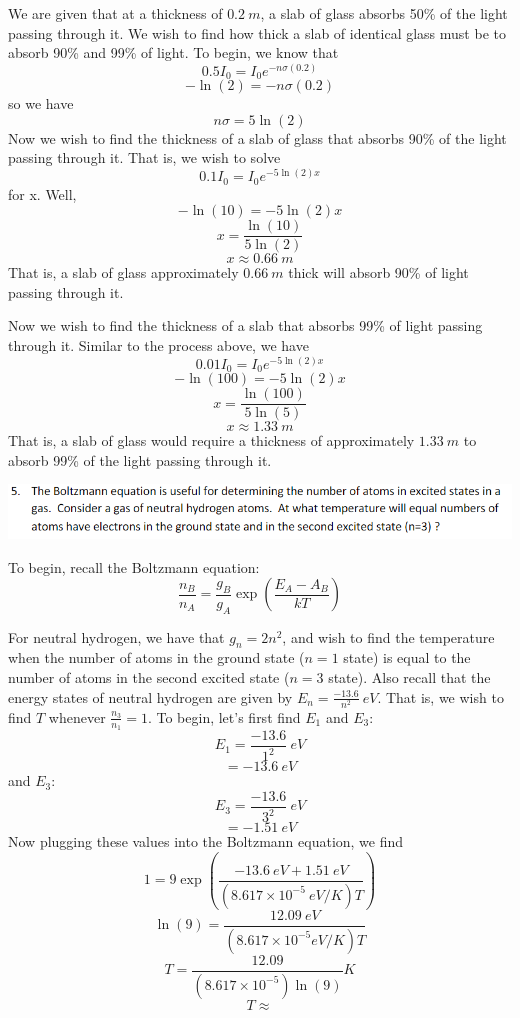\documentclass{article}
\begin{document}
We are given that at a thickness of $0.2 \:m$, a slab of glass absorbs 50\% of the light passing through it. We wish to find how thick a slab of identical glass must be to absorb 90\% and 99\% of light. To begin, we know that
\[0.5I_0 = I_0 e^{-n\sigma (0.2) }\]
\[-\ln{(2)} = -n\sigma (0.2)\]
so we have
\[n\sigma = 5\ln{(2)}\]
Now we wish to find the thickness of a slab of glass that absorbs 90\% of the light passing through it. That is, we wish to solve
\[0.1I_0 = I_0e^{-5\ln{(2)}x}\]
for x. Well,
\[-\ln{(10)} = -5\ln{(2)}x\]
\[x = \frac{\ln{(10)}}{5\ln{(2)}}\]
\[x \approx 0.66 \:m\]
That is, a slab of glass approximately $0.66 \:m$ thick will absorb 90\% of light passing through it.

Now we wish to find the thickness of a slab that absorbs 99\% of light passing through it. Similar to the process above, we have
\[0.01I_0 = I_0e^{-5\ln{(2)}x}\]
\[-\ln{(100)} = -5\ln{(2)}x\]
\[x = \frac{\ln{(100)}}{5\ln{(5)}}\]
\[x \approx 1.33 \:m\]
That is, a slab of glass would require a thickness of approximately $1.33 \:m$ to absorb 99\% of the light passing through it.
\newline

\includegraphics[scale = 0.8]{probset6prob5.PNG}
\newline

To begin, recall the Boltzmann equation:
\[\frac{n_B}{n_A} = \frac{g_B}{g_A}\exp{(\frac{E_A - A_B}{kT})}\]

For neutral hydrogen, we have that $g_n = 2n^2$, and wish to find the temperature when the number of atoms in the ground state ($n = 1$ state) is equal to the number of atoms in the second excited state ($n = 3$ state). Also recall that the energy states of neutral hydrogen are given by $E_n = \frac{-13.6}{n^2} \: eV$.
That is, we wish to find $T$ whenever $\frac{n_3}{n_1} = 1$. 
To begin, let's first find $E_1$ and $E_3$:
\[E_1 = \frac{-13.6}{1^2} \:eV\]
\[ = -13.6 \:eV\]
and $E_3$:
\[E_3 = \frac{-13.6}{3^2} \: eV\]
\[ = -1.51 \: eV\]
Now plugging these values into the Boltzmann equation, we find
\[1 = 9\exp{(\frac{-13.6 \: eV + 1.51 \:eV}{(8.617 \times 10^{-5} \: eV/K)T})}\]
\[\ln{(9)} = \frac{12.09 \: eV}{(8.617 \times 10^{-5} eV/K)T}\]
\[T = \frac{12.09}{(8.617 \times 10^{-5})\ln{(9)}}K\]
\[T \approx\]
 
\end{document}
